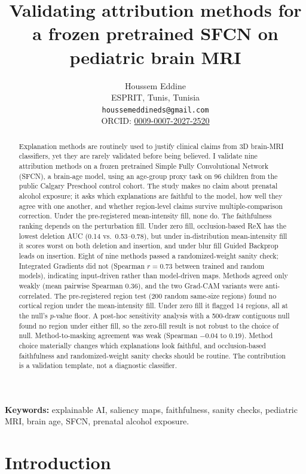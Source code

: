 \documentclass[11pt]{article}
\title{\textbf{Validating attribution methods for a frozen pretrained SFCN on pediatric brain MRI}}
\author{Houssem Eddine\\[2pt]
\small ESPRIT, Tunis, Tunisia\\
\small \texttt{houssemeddineds@gmail.com}\\
\small ORCID: \href{https://orcid.org/0009-0007-2027-2520}{0009-0007-2027-2520}}
\date{}
\begin{document}
\maketitle

\begin{abstract}
\noindent
Explanation methods are routinely used to justify clinical claims from 3D brain-MRI
classifiers, yet they are rarely validated before being believed. I validate nine attribution
methods on a frozen pretrained Simple Fully Convolutional Network (SFCN), a brain-age model,
using an age-group proxy task on 96 children from the public Calgary Preschool control cohort.
The study makes no claim about prenatal alcohol exposure; it asks which explanations are
faithful to the model, how well they agree with one another, and whether region-level claims survive
multiple-comparison correction. Under the pre-registered mean-intensity fill, none do. The faithfulness ranking depends on the perturbation fill. Under zero fill, occlusion-based ReX has the lowest deletion AUC (0.14 vs.\ 0.53--0.78), but under in-distribution mean-intensity fill it scores worst on both deletion and insertion, and under blur fill Guided Backprop leads on insertion. Eight of nine methods passed
a randomized-weight sanity check; Integrated Gradients did not (Spearman $r=0.73$ between
trained and random models), indicating input-driven rather than model-driven maps. Methods
agreed only weakly (mean pairwise Spearman 0.36), and the two Grad-CAM variants were
anti-correlated. The pre-registered region test (200 random same-size regions) found no cortical
region under the mean-intensity fill. Under zero fill it flagged 14 regions, all at the null's
$p$-value floor. A post-hoc sensitivity analysis with a 500-draw contiguous null found no region under
either fill, so the zero-fill result is not robust to the choice of null. Method-to-masking agreement
was weak (Spearman $-0.04$ to $0.19$). Method choice materially changes which explanations look faithful,
and occlusion-based faithfulness and randomized-weight sanity checks should be routine.
The contribution is a validation template, not a diagnostic classifier.
\end{abstract}

\textbf{Keywords:} explainable AI, saliency maps, faithfulness, sanity checks, pediatric
MRI, brain age, SFCN, prenatal alcohol exposure.

\section{Introduction}
\end{document}
